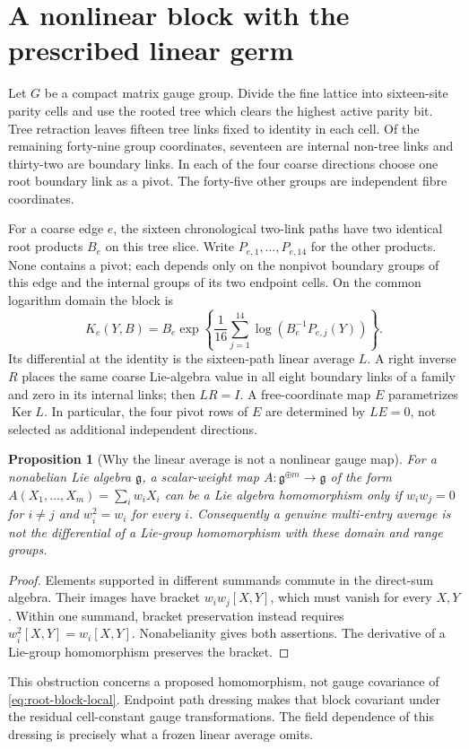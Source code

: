 \documentclass[11pt,oneside,openany]{book}
\newtheorem{proposition}[proposition]{Proposition}
\theoremstyle{definition}
\theoremstyle{remark}
\newcommand{\Ker}{\operatorname{Ker}}
\newcommand{\src}[2]{\cite[#2]{#1}}
\begin{document}
\section{A nonlinear block with the prescribed linear germ}
\label{sec:nonlinear-root-block}
Let $G$ be a compact matrix gauge group. Divide the fine lattice into
sixteen-site parity cells and use the rooted tree which clears the
highest active parity bit. Tree retraction leaves fifteen tree links
fixed to identity in each cell. Of the remaining forty-nine group
coordinates, seventeen are internal non-tree links and thirty-two are
boundary links. In each of the four coarse directions choose one root
boundary link as a pivot. The forty-five other groups are independent
fibre coordinates.

For a coarse edge $e$, the sixteen chronological two-link paths have two
identical root products $B_e$ on this tree slice. Write
$P_{e,1},\ldots,P_{e,14}$ for the other products. None contains a pivot;
each depends only on the nonpivot boundary groups of this edge and the
internal groups of its two endpoint cells. On the common logarithm
domain the block is
\begin{equation}\label{eq:root-block-local}
K_e(Y,B)=B_e\exp\left\{\frac1{16}\sum_{j=1}^{14}
                  \log(B_e^{-1}P_{e,j}(Y))\right\}.
\end{equation}
Its differential at the identity is the sixteen-path linear average
$L$. A right inverse $R$ places the same coarse Lie-algebra value in all
eight boundary links of a family and zero in its internal links; then
$LR=I$. A free-coordinate map $E$ parametrizes $\Ker L$. In particular,
the four pivot rows of $E$ are determined by $LE=0$, not selected as
additional independent directions. \src{F11}{V57--V58, V64--V66, V76}

\begin{proposition}[Why the linear average is not a nonlinear gauge map]
\label{prop:nonabelian-average}
For a nonabelian Lie algebra $\mathfrak g$, a scalar-weight map
$A:\mathfrak g^{\oplus m}\to\mathfrak g$ of the form
$A(X_1,\ldots,X_m)=\sum_i w_iX_i$ can be a Lie algebra homomorphism
only if $w_iw_j=0$ for $i\ne j$ and $w_i^2=w_i$ for every $i$.
Consequently a genuine multi-entry average is not the differential of
a Lie-group homomorphism with these domain and range groups.
\end{proposition}
\begin{proof}
Elements supported in different summands commute in the direct-sum
algebra. Their images have bracket $w_iw_j[X,Y]$, which must vanish
for every $X,Y$. Within one summand, bracket preservation instead
requires $w_i^2[X,Y]=w_i[X,Y]$. Nonabelianity gives both assertions.
The derivative of a Lie-group homomorphism preserves the bracket.
\end{proof}
This obstruction concerns a proposed homomorphism, not gauge covariance
of \cref{eq:root-block-local}. Endpoint path dressing makes that block
covariant under the residual cell-constant gauge transformations. The
field dependence of this dressing is precisely what a frozen linear
average omits. \src{F11}{V56--V57}
\end{document}
